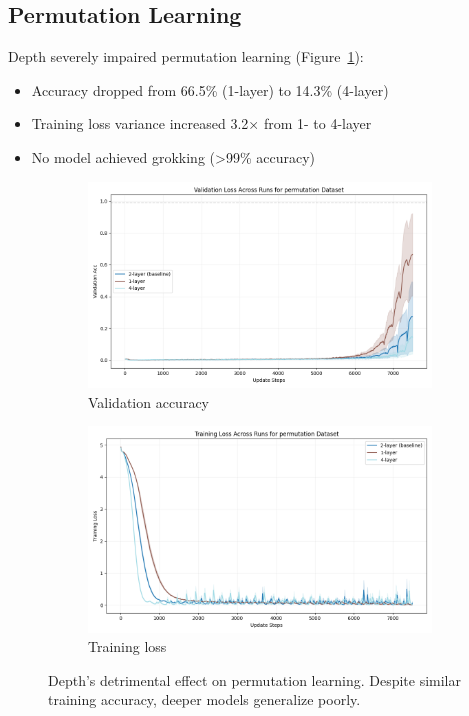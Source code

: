 \documentclass{article} %
\begin{document}
\subsection{Permutation Learning}
Depth severely impaired permutation learning (Figure~\ref{fig:permutation}):
\begin{itemize}
    \item Accuracy dropped from 66.5\% (1-layer) to 14.3\% (4-layer)
    \item Training loss variance increased 3.2× from 1- to 4-layer
    \item No model achieved grokking (>99\% accuracy)
\end{itemize}

\begin{figure}[h]
    \centering
    \begin{subfigure}{0.49\textwidth}
        \includegraphics[width=\textwidth]{val_acc_permutation.png}
        \caption{Validation accuracy}
    \end{subfigure}
    \hfill
    \begin{subfigure}{0.49\textwidth}
        \includegraphics[width=\textwidth]{train_loss_permutation.png}
        \caption{Training loss}
    \end{subfigure}
    \caption{Depth's detrimental effect on permutation learning. Despite similar training accuracy, deeper models generalize poorly.}
    \label{fig:permutation}
\end{figure}
\end{document}
